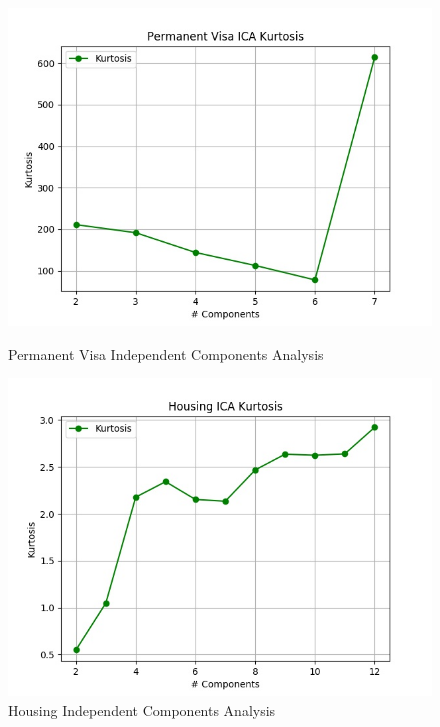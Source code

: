 \documentclass[h]{article}
\begin{document}
 \begin{figure}[H]
      \includegraphics[width=1\textwidth,keepaspectratio]{permanent_visa_ica_kurtosis.jpg} 
      \caption*{Permanent Visa Independent Components Analysis } 
   \endminipage\hfill
      \includegraphics[width=1\textwidth,keepaspectratio]{housing_ica_kurtosis.jpg} 
      \caption*{Housing Independent Components Analysis } 
   \endminipage\hfill
\end{figure}
\end{document}
